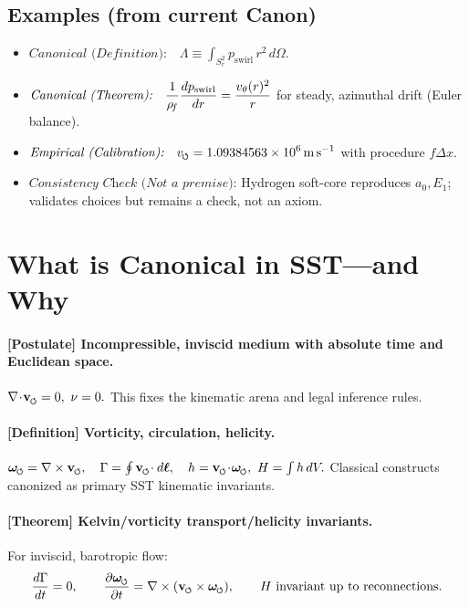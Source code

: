 \documentclass[11pt]{article}
\begin{document}
    \subsection*{Examples (from current Canon)}
    \begin{itemize}
        \item \(\displaystyle \textit{Canonical (Definition):}\quad \Lambda \equiv \int_{S_r^2} p_{\text{swirl}}\,r^2\,d\Omega.\)
        \item \(\displaystyle \textit{Canonical (Theorem):}\quad \frac{1}{\rho_{\!f}}\frac{dp_{\text{swirl}}}{dr}=\frac{v_\theta(r)^2}{r}\) for steady, azimuthal drift (Euler balance).
        \item \(\displaystyle \textit{Empirical (Calibration):}\quad \vscore=1.09384563\times10^{6}\,\mathrm{m\,s^{-1}}\) with procedure \(f\Delta x\).
        \item \(\displaystyle \textit{Consistency Check (Not a premise):}\) Hydrogen soft-core reproduces \(a_0,E_1\); validates choices but remains a check, not an axiom.
    \end{itemize}

    \section{What is Canonical in SST—and Why}

    \paragraph{[Postulate] Incompressible, inviscid medium with absolute time and Euclidean space.}
    \(\nabla\!\cdot\!\vswirl=0,\ \nu=0.\)
    This fixes the kinematic arena and legal inference rules.

    \paragraph{[Definition] Vorticity, circulation, helicity.}
    \(\omegas=\nabla\times \vswirl,\quad \Gamma=\oint \vswirl\!\cdot d\boldsymbol{\ell},\quad h=\vswirl\!\cdot\!\omegas,\ H=\int h\,dV.\)
    Classical constructs canonized as primary SST kinematic invariants.

    \paragraph{[Theorem] Kelvin/vorticity transport/helicity invariants.}
    For inviscid, barotropic flow:
    \[
        \frac{d\Gamma}{dt}=0,\qquad
        \pdv{\omegas}{t}=\nabla\times(\vswirl\times\omegas),\qquad
        \text{$H$ invariant up to reconnections}.
    \]
\end{document}
